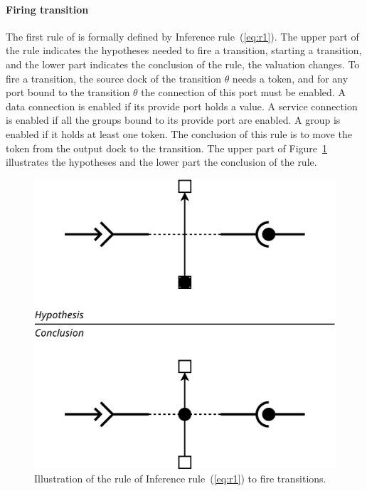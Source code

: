 \paragraph{Firing transition}{

The first rule of \mad is formally defined by
Inference rule~(\ref{eq:r1}). The upper part of the rule indicates the
hypotheses needed to fire a transition, \ie starting a transition,
and the lower part indicates the conclusion of the rule, \ie the valuation
changes. To fire a transition, the source dock of the transition
$\theta$ needs a token, and for any port bound to the transition
$\theta$ the connection of this port must be enabled. A data connection is
enabled if its provide port holds a value. A service connection
is enabled if all the groups bound to its provide port are enabled.
A group is enabled if it holds at least one token. The conclusion of
this rule is to move the token from the output dock to the
transition. The upper part of Figure~\ref{fig:r1} illustrates the
hypotheses and the lower part the conclusion of the rule.

\begin{figure}[t]
\begin{center}
  \includegraphics[width=0.55\columnwidth]{./images/firing.pdf}
\end{center}
\caption{Illustration of the rule of Inference rule~(\ref{eq:r1}) to fire transitions.}
\label{fig:r1}
\end{figure}

}

